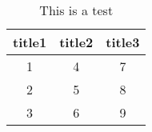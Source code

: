 \begin{table}[h!]
\centering
\begin{tabular}{|| c c c ||}
\hline
title1 & title2 & title3 \\
 \hline\hline
1 & 4 & 7 \\
2 & 5 & 8 \\
3 & 6 & 9 \\
\hline 
\end{tabular} 
\caption{This is a test} 
\label{still an issue?} 
\end{table}
